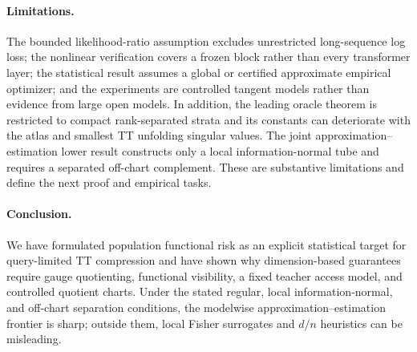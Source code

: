 \paragraph{Limitations.}
The bounded likelihood-ratio assumption excludes unrestricted long-sequence log loss; the nonlinear verification covers a frozen block rather than every transformer layer; the statistical result assumes a global or certified approximate empirical optimizer; and the experiments are controlled tangent models rather than evidence from large open models. In addition, the leading oracle theorem is restricted to compact rank-separated strata and its constants can deteriorate with the atlas and smallest TT unfolding singular values. The joint approximation--estimation lower result constructs only a local information-normal tube and requires a separated off-chart complement. These are substantive limitations and define the next proof and empirical tasks.

\paragraph{Conclusion.}
We have formulated population functional risk as an explicit statistical target for query-limited TT compression and have shown why dimension-based guarantees require gauge quotienting, functional visibility, a fixed teacher access model, and controlled quotient charts. Under the stated regular, local information-normal, and off-chart separation conditions, the modelwise approximation--estimation frontier is sharp; outside them, local Fisher surrogates and \(d/n\) heuristics can be misleading.
